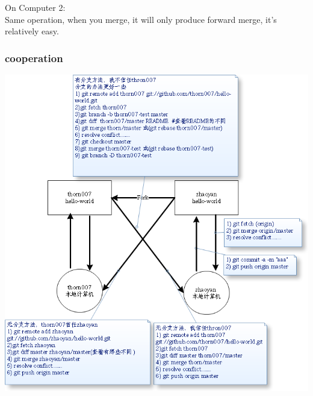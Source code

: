 \documentclass[a4paper,12pt,twoside]{book}
\begin{document}
On Computer 2: \\

Same operation, when you merge, it will only produce forward merge, it's relatively easy.

\subsubsection{cooperation}
\includegraphics[scale=0.8]{pics/git-corp} \\

\end{document}

